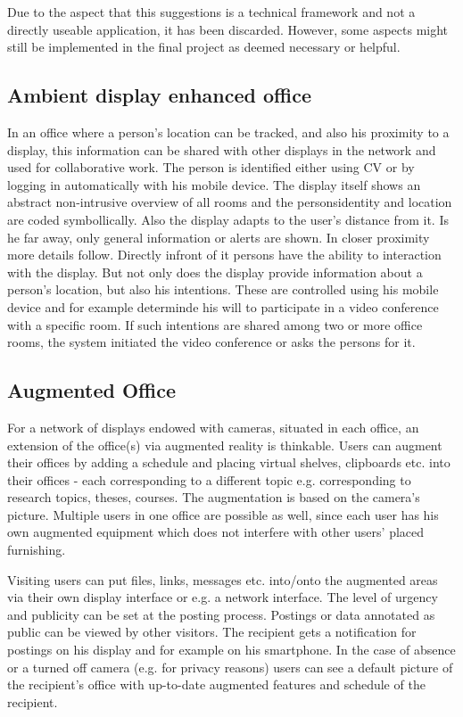 Due to the aspect that this suggestions is a technical framework and not a directly useable application, it has been discarded.
However, some aspects might still be implemented in the final project as deemed necessary or helpful.

\subsection{Ambient display enhanced office}
In an office where a person’s location can be tracked, and also his proximity to a display, this information can be shared with other displays in the network and used for collaborative work.
The person is identified either using CV or by logging in automatically with his mobile device.
The display itself shows an abstract non-intrusive overview of all rooms and the personsidentity and location are coded symbollically.
Also the display adapts to the user’s distance from it.
Is he far away, only general information or alerts are shown.
In closer proximity more details follow. Directly infront of it persons have the ability to interaction with the display.
But not only does the display provide information about a person’s location, but also his intentions.
These are controlled using his mobile device and for example determinde his will to participate in a video conference with a specific room.
If such intentions are shared among two or more office rooms, the system initiated the video conference or asks the persons for it.

\subsection{Augmented Office}
For a network of displays endowed with cameras, situated in each office, an extension of the office(s) via augmented reality is thinkable.
Users can augment their offices by adding a schedule and placing virtual shelves, clipboards etc. into their offices - each corresponding to a different topic e.g. corresponding to research topics, theses, courses.
The augmentation is based on the camera's picture.
Multiple users in one office are possible as well, since each user has his own augmented equipment which does not interfere with other users' placed furnishing.

Visiting users can put files, links, messages etc. into/onto the augmented areas via their own display interface or e.g. a network interface.
The level of urgency and publicity can be set at the posting process.
Postings or data annotated as public can be viewed by other visitors.
The recipient gets a notification for postings on his display and for example on his smartphone.
In the case of absence or a turned off camera (e.g. for privacy reasons) users can see a default picture of the recipient’s office with up-to-date augmented features and schedule of the recipient.

